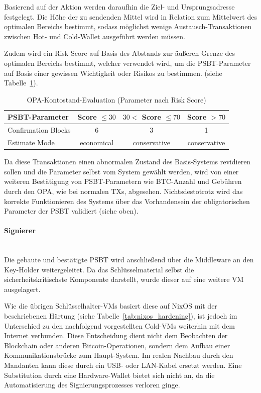 Basierend auf der Aktion werden daraufhin die Ziel- und Ursprungsadresse festgelegt. Die Höhe der zu sendenden Mittel wird in Relation zum Mittelwert des optimalen Bereichs bestimmt, sodass möglichst wenige Austausch-Transaktionen zwischen Hot- und Cold-Wallet ausgeführt werden müssen.

Zudem wird ein Risk Score auf Basis des Abstands zur äußeren Grenze des optimalen Bereichs bestimmt, welcher verwendet wird, um die \ac{PSBT}-Parameter auf Basis einer gewissen Wichtigkeit oder Risikos zu bestimmen. (siehe Tabelle~\ref{tab:OPA_fundSwitch}).
\begin{table}[htbp]
\centering
\begin{tabular}{l c c c}
\toprule
\textbf{\ac{PSBT}-Parameter} & \textbf{Score $\le 30$} & \textbf{$30 <$ Score $\le 70$} & \textbf{Score $> 70$} \\
\midrule
Confirmation Blocks & 6 & 3 & 1 \\
Estimate Mode & economical & conservative & conservative \\
\bottomrule
\end{tabular}
\caption{\ac{OPA}-Kontostand-Evaluation (Parameter nach Risk Score)}
\label{tab:OPA_fundSwitch}
\end{table}

Da diese Transaktionen einen abnormalen Zustand des Basis-Systems revidieren sollen und die Parameter selbst vom System gewählt werden, wird von einer weiteren Bestätigung von \ac{PSBT}-Parametern wie \ac{BTC}-Anzahl und Gebühren durch den \ac{OPA}, wie bei normalen \acp{TX}, abgesehen. Nichtsdestotrotz wird das korrekte Funktionieren des Systems über das Vorhandensein der obligatorischen Parameter der \ac{PSBT} validiert (siehe oben).


\paragraph{Signierer} \mbox{}\\
Die gebaute und bestätigte \ac{PSBT} wird anschließend über die Middleware an den Key-Holder weitergeleitet.
Da das Schlüsselmaterial selbst die sicherheitskritischste Komponente darstellt, wurde dieser auf eine weitere \ac{VM} ausgelagert.

Wie die übrigen Schlüsselhalter-\acp{VM} basiert diese auf NixOS mit der beschriebenen Härtung (siehe Tabelle~\ref{tab:nixos_hardening}), ist jedoch im Unterschied zu den nachfolgend vorgestellten Cold-\acp{VM} weiterhin mit dem Internet verbunden.
Diese Entscheidung dient nicht dem Beobachten der Blockchain oder anderen Bitcoin-Operationen, sondern dem Aufbau einer Kommunikationsbrücke zum Haupt-System. Im realen Nachbau durch den Mandanten kann diese durch ein \ac{USB}- oder \ac{LAN}-Kabel ersetzt werden. Eine Substitution durch eine Hardware-Wallet bietet sich nicht an, da die Automatisierung des Signierungsprozesses verloren ginge.

